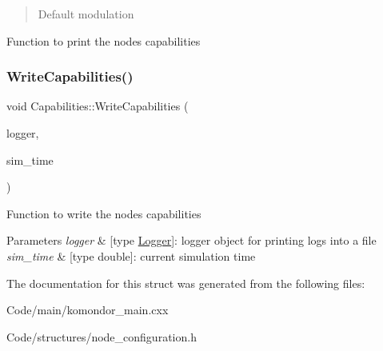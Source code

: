 \begin{quote}
Default modulation \end{quote}


Function to print the node\textquotesingle{}s capabilities \mbox{\label{structCapabilities_ab89f31c181ad2ec790b4c7f8dde21609}} 
\subsubsection{\texorpdfstring{Write\+Capabilities()}{WriteCapabilities()}}
{\footnotesize\ttfamily void Capabilities\+::\+Write\+Capabilities (\begin{DoxyParamCaption}\item[{\hyperlink{structLogger}{Logger}}]{logger,  }\item[{double}]{sim\+\_\+time }\end{DoxyParamCaption})\hspace{0.3cm}{\ttfamily [inline]}}

Function to write the node\textquotesingle{}s capabilities 
\begin{DoxyParams}{Parameters}
{\em logger} & \mbox{[}type \hyperlink{structLogger}{Logger}\mbox{]}\+: logger object for printing logs into a file \\
\hline
{\em sim\+\_\+time} & \mbox{[}type double\mbox{]}\+: current simulation time \\
\hline
\end{DoxyParams}


The documentation for this struct was generated from the following files\+:\begin{DoxyCompactItemize}
\item 
Code/main/komondor\+\_\+main.\+cxx\item 
Code/structures/node\+\_\+configuration.\+h\end{DoxyCompactItemize}
